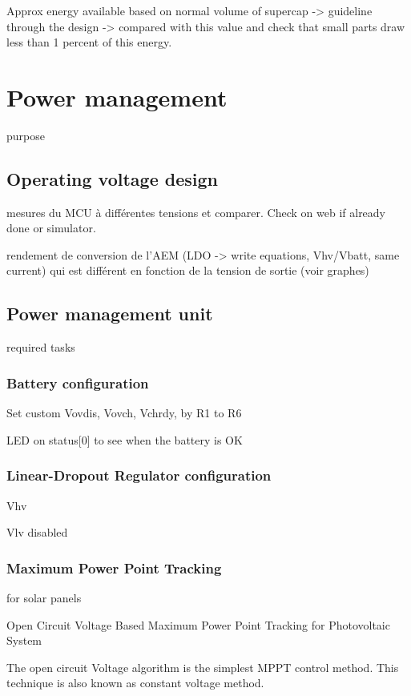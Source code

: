 \documentclass{EPL-master-thesis-covers-EN}
\begin{document}
Approx energy available based on normal volume of supercap -> guideline through the design -> compared with this value and check that small parts draw less than 1 percent of this energy.

\chapter{Power management}

purpose

\section{Operating voltage design}
\label{section:operating_voltage}

mesures du MCU à différentes tensions et comparer. Check on web if already done or simulator.

rendement de conversion de l'AEM (LDO -> write equations, Vhv/Vbatt, same current) qui est différent en fonction de la tension de sortie (voir graphes)

\section{Power management unit}

required tasks

\subsection*{Battery configuration}

Set custom Vovdis, Vovch, Vchrdy, by R1 to R6

LED on status[0] to see when the battery is OK

\subsection*{Linear-Dropout Regulator configuration}

Vhv

Vlv disabled


\subsection*{Maximum Power Point Tracking}

 for solar panels
 
 Open Circuit Voltage Based Maximum Power Point Tracking for Photovoltaic System
 
 The open circuit Voltage algorithm is the simplest MPPT control method. This technique is also known as constant voltage method.
 
\end{document}
